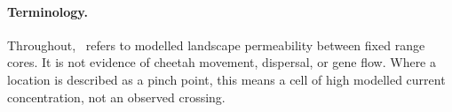 \paragraph{Terminology.} Throughout, \structconn\ refers to modelled landscape
permeability between fixed range cores. It is not evidence of cheetah movement,
dispersal, or gene flow. Where a location is described as a pinch point, this means
a cell of high modelled current concentration, not an observed crossing.
